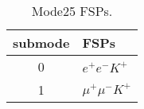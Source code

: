 \begin{table}[h!]
\begin{center}
\begin{tabular}{cl}
\hline
submode& FSPs\\
\hline
0 & $e^+ e^- K^+ $ \\
1 & $\mu^+ \mu^- K^+ $ \\
\hline
\end{tabular}
\label{tab:Mode25FSPs}
\caption{Mode25 FSPs.}
\end{center}
\end{table}

